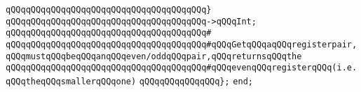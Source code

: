 \verb|qQQqqQQqqQQqqQQqqQQqqQQqqQQqqQQqqQQqqQQq}|\newline
\verb|qQQqqQQqqQQqqQQqqQQqqQQqqQQqqQQqqQQqqQQq->qQQqInt;|\newline
\verb|qQQqqQQqqQQqqQQqqQQqqQQqqQQqqQQqqQQqqQQq#|\newline
\verb|qQQqqQQqqQQqqQQqqQQqqQQqqQQqqQQqqQQqqQQq#qQQqGetqQQqaqQQqregisterpair,qQQqmustqQQqbeqQQqanqQQqeven/oddqQQqpair,qQQqreturnsqQQqthe|\newline
\verb|qQQqqQQqqQQqqQQqqQQqqQQqqQQqqQQqqQQqqQQq#qQQqevenqQQqregisterqQQq(i.e.qQQqtheqQQqsmallerqQQqone)|\newline
\verb|qQQqqQQqqQQqqQQq};|\newline
\verb|end;|\newline

